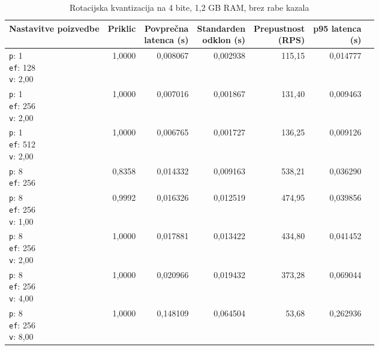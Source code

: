 \begin{table}[htbp]
  \centering
\small
  \caption{Rotacijska kvantizacija na 4 bite, 1,2 GB RAM, brez rabe kazala}
  \label{tab:single-2cpu-1.2ram:fullscan-tq4:qdrant-dipl-fullscan-tq4-m16-ef-128-random-768-100-tenants-extended-upload-2026-08-19-15-11-01.json}
  \begin{tabularx}{\textwidth}{Xrrrrrr}
    \toprule
    Nastavitve poizvedbe & Priklic & \makecell{Povprečna\\latenca (s)} & \makecell{Standarden\\odklon (s)} & \makecell{Prepustnost\\(RPS)} & \makecell{p95 latenca\\(s)}  \\
    \midrule
    \makecell{\texttt{p}: 1\\\texttt{ef}: 128\\\texttt{v}: 2,00} & 1,0000 & 0,008067 & 0,002938 & 115,15 & 0,014777 \\
    \makecell{\texttt{p}: 1\\\texttt{ef}: 256\\\texttt{v}: 2,00} & 1,0000 & 0,007016 & 0,001867 & 131,40 & 0,009463 \\
    \makecell{\texttt{p}: 1\\\texttt{ef}: 512\\\texttt{v}: 2,00} & 1,0000 & 0,006765 & 0,001727 & 136,25 & 0,009126 \\
    \makecell{\texttt{p}: 8\\\texttt{ef}: 256} & 0,8358 & 0,014332 & 0,009163 & 538,21 & 0,036290 \\
    \makecell{\texttt{p}: 8\\\texttt{ef}: 256\\\texttt{v}: 1,00} & 0,9992 & 0,016326 & 0,012519 & 474,95 & 0,039856 \\
    \makecell{\texttt{p}: 8\\\texttt{ef}: 256\\\texttt{v}: 2,00} & 1,0000 & 0,017881 & 0,013422 & 434,80 & 0,041452 \\
    \makecell{\texttt{p}: 8\\\texttt{ef}: 256\\\texttt{v}: 4,00} & 1,0000 & 0,020966 & 0,019432 & 373,28 & 0,069044 \\
    \makecell{\texttt{p}: 8\\\texttt{ef}: 256\\\texttt{v}: 8,00} & 1,0000 & 0,148109 & 0,064504 & 53,68 & 0,262936 \\

\end{tabularx}
\end{table}
